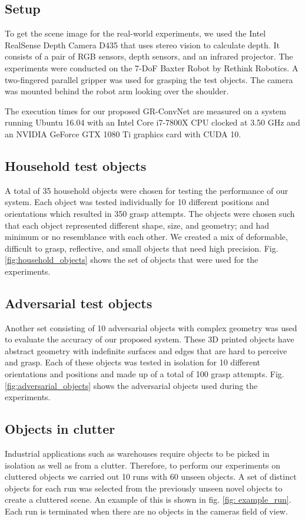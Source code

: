 \documentclass[letterpaper, 10pt, conference]{IEEEtran}
\begin{document}
\subsection{Setup}
To get the scene image for the real-world experiments, we used the Intel RealSense Depth Camera D435 that uses stereo vision to calculate depth. It consists of a pair of RGB sensors, depth sensors, and an infrared projector. The experiments were conducted on the 7-DoF Baxter Robot by Rethink Robotics. A two-fingered parallel gripper was used for grasping the test objects. The camera was mounted behind the robot arm looking over the shoulder.

The execution times for our proposed GR-ConvNet are measured on a system running Ubuntu 16.04 with an Intel Core i7-7800X CPU clocked at 3.50 GHz and an NVIDIA GeForce GTX 1080 Ti graphics card with CUDA 10.

\subsection{Household test objects}
A total of 35 household objects were chosen for testing the performance of our system. Each object was tested individually for 10 different positions and orientations which resulted in 350 grasp attempts. The objects were chosen such that each object represented different shape, size, and geometry; and had minimum or no resemblance with each other. We created a mix of deformable, difficult to grasp, reflective, and small objects that need high precision. Fig. \ref{fig:household_objects} shows the set of objects that were used for the experiments.

\subsection{Adversarial test objects}
Another set consisting of 10 adversarial objects with complex geometry was used to evaluate the accuracy of our proposed system. These 3D printed objects have abstract geometry with indefinite surfaces and edges that are hard to perceive and grasp. Each of these objects was tested in isolation for 10 different orientations and positions and made up of a total of 100 grasp attempts. Fig. \ref{fig:adversarial_objects} shows the adversarial objects used during the experiments.

\subsection{Objects in clutter}
Industrial applications such as warehouses require objects to be picked in isolation as well as from a clutter. Therefore, to perform our experiments on cluttered objects we carried out 10 runs with 60 unseen objects. A set of distinct objects for each run was selected from the previously unseen novel objects to create a cluttered scene. An example of this is shown in fig. \ref{fig: example_run}. Each run is terminated when there are no objects in the camera\textquotesingle s field of view. 
\end{document}

